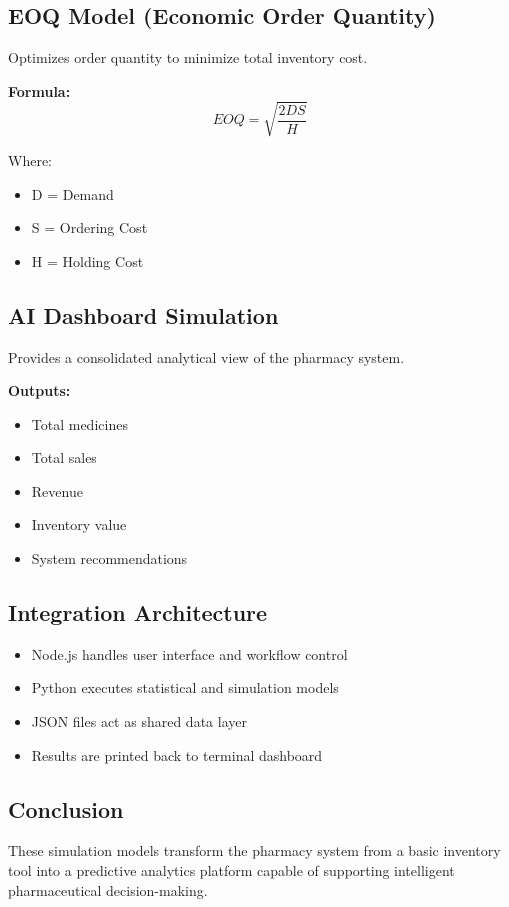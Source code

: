\documentclass[12pt,a4paper]{article}
\begin{document}
\subsection{ EOQ Model (Economic Order Quantity)}

Optimizes order quantity to minimize total inventory cost.

\textbf{Formula:}
\[
EOQ = \sqrt{\frac{2DS}{H}}
\]

Where:
\begin{itemize}
\item D = Demand
\item S = Ordering Cost
\item H = Holding Cost
\end{itemize}

\subsection{ AI Dashboard Simulation}

Provides a consolidated analytical view of the pharmacy system.

\textbf{Outputs:}
\begin{itemize}
\item Total medicines
\item Total sales
\item Revenue
\item Inventory value
\item System recommendations
\end{itemize}

\subsection{Integration Architecture}

\begin{itemize}
\item Node.js handles user interface and workflow control
\item Python executes statistical and simulation models
\item JSON files act as shared data layer
\item Results are printed back to terminal dashboard
\end{itemize}

\subsection{Conclusion}

These simulation models transform the pharmacy system from a basic inventory tool into a predictive analytics platform capable of supporting intelligent pharmaceutical decision-making.
\end{document}
